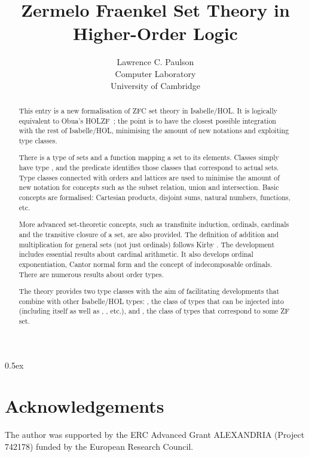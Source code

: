 \documentclass[11pt,a4paper]{article}
\begin{document}
\title{Zermelo Fraenkel Set Theory in Higher-Order Logic}
\author{Lawrence C. Paulson\\ Computer Laboratory\\ University of Cambridge}

\maketitle

\begin{abstract}
This entry is a new formalisation of ZFC set theory in Isabelle/HOL\@.
It is logically equivalent to Obua's HOLZF~\cite{obua-partizan-games}; the point is to have the closest possible integration
with the rest of Isabelle/HOL, minimising the amount of new notations and exploiting type classes.

There is a type  of sets and a function
 mapping a set to its elements.
Classes simply have type , and the predicate  identifies those classes that correspond to actual sets.
Type classes connected with orders and lattices are used to minimise the amount of new notation
for concepts such as the subset relation, union and intersection.
Basic concepts are formalised: Cartesian products, disjoint sums, natural numbers, functions, etc.

More advanced set-theoretic concepts, such as transfinite induction, ordinals, cardinals
and the transitive closure of a set, are also provided.
The definition of addition and multiplication for general sets (not just ordinals) follows Kirby \cite{kirby-addition}.
The development includes essential results about cardinal arithmetic. It also develops ordinal exponentiation, Cantor normal form and the concept of indecomposable ordinals. There are numerous results about order types.

The theory provides two type classes with the aim of
facilitating developments that combine  with other Isabelle/HOL types:
, the class of types that can be injected into~ (including  itself as well as , , etc.), and
, the class of types that correspond to some ZF set.
\end{abstract}

\newpage
\tableofcontents

\parindent 0pt\parskip 0.5ex

\newpage


\section{Acknowledgements}
The author was supported by the ERC Advanced Grant ALEXANDRIA (Project 742178) funded by the European Research Council.



\end{document}
